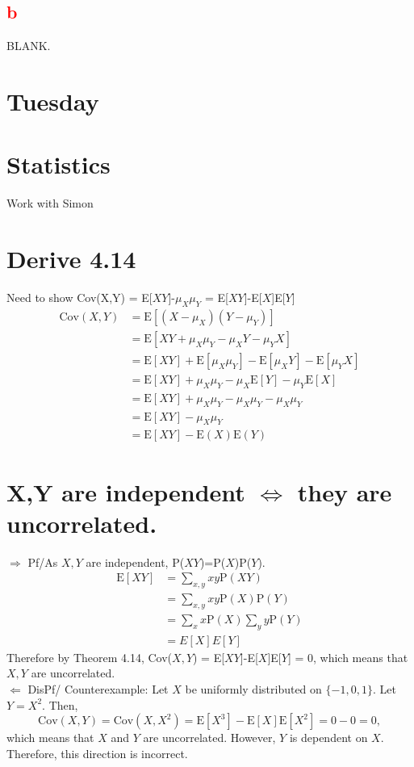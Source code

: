 \documentclass{article}
\begin{document}
\subsection*{\textcolor{red}{b}}
BLANK.


\section*{{\textcolor{Boogie}{Tuesday}}}
\section*{Statistics} Work with Simon
\section*{Derive 4.14}
Need to show Cov(X,Y) = E[$XY$]-$\mu_X\mu_Y$ = E[$XY$]-E[$X$]E[$Y$]\\
\begin{align*}
\text{Cov}(X,Y) &= \text{E}[(X-\mu_X)(Y-\mu_Y)]\\
&= \text{E}[XY+\mu_X\mu_Y-\mu_XY-\mu_YX]\\
&= \text{E}[XY]+\text{E}[\mu_X\mu_Y]-\text{E}[\mu_XY]-\text{E}[\mu_YX]\\
&= \text{E}[XY]+\mu_X\mu_Y-\mu_X\text{E}[Y]-\mu_Y\text{E}[X]\\
&= \text{E}[XY]+\mu_X\mu_Y-\mu_X\mu_Y-\mu_X\mu_Y\\
&= \text{E}[XY]-\mu_X\mu_Y\\
&= \text{E}[XY]-\text{E}(X)\text{E}(Y)
\end{align*}

\section*{X,Y are independent $\Leftrightarrow$ they are uncorrelated.}
$\Rightarrow$ Pf/As $X,Y$ are independent, P($XY$)=P($X$)P($Y$).\\
\begin{align*}
    \text{E}[XY] &= \sum_{x,y} xy\text{P}(XY)\\
    &=\sum_{x,y} xy\text{P}(X)\text{P}(Y) \\
    &=\sum_{x} x\text{P}(X)\sum_{y}y\text{P}(Y) \\
    &=E[X]E[Y]
\end{align*}
Therefore by Theorem 4.14, Cov($X,Y$) = E[$XY$]-E[$X$]E[$Y$] = $0$, which means that $X,Y$ are uncorrelated.\\

\noindent
$\Leftarrow$ DisPf/ Counterexample: Let $X$ be uniformly distributed on $\{-1,0,1\}$. Let $Y=X^2$. Then, $$ \text{Cov}(X,Y) = \text{Cov}(X,X^2) = \text{E}[X^3]-\text{E}[X]\text{E}[X^2]=0-0=0,
$$ which means that $X$ and $Y$ are uncorrelated. However, $Y$ is dependent on $X$. Therefore, this direction is incorrect. 
\end{document}

